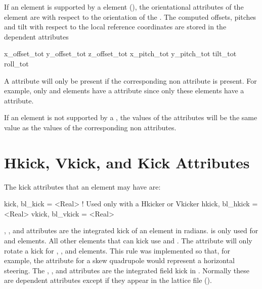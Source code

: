 If an element is supported by a  element (),
the orientational attributes of the element are with respect to the
orientation of the . The computed offsets, pitches and tilt with
respect to the local reference coordinates are stored in the dependent attributes
\begin{example}
  x_offset_tot
  y_offset_tot
  z_offset_tot
  x_pitch_tot
  y_pitch_tot
  tilt_tot
  roll_tot
\end{example}
A  attribute will only be present if the corresponding non
 attribute is present. For example, only  and
 elements have a  attribute since only these
elements have a  attribute.

If an element is not supported by a , the values of the
 attributes will be the same value as the values of the
corresponding non  attributes.

\section{Hkick, Vkick, and Kick Attributes}
\label{s:kick}


The kick attributes that an element may have are:
\begin{example}
  kick,  bl_kick  = <Real>  ! Used only with a Hkicker or Vkicker
  hkick, bl_hkick = <Real>
  vkick, bl_vkick = <Real>
\end{example}
, , and  attributes are the integrated
kick of an element in radians.  is only used for 
and  elements. All other elements that can kick use
 and . The  attribute will only rotate a
kick for , ,  and 
elements. This rule was implemented so that, for example, the
 attribute for a skew quadrupole would represent a
horizontal steering. The , , and
 attributes are the integrated field kick in
. Normally these are dependent attributes except if
they appear in the lattice file ().

